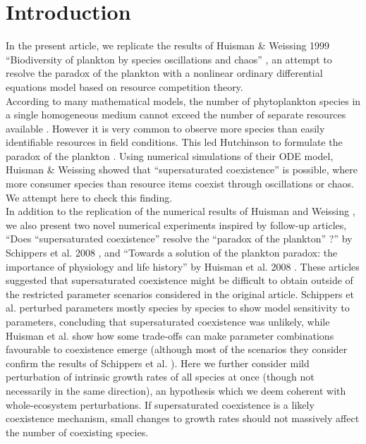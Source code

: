 \section{Introduction}
In the present article, we replicate the results of Huisman \& Weissing 1999 ``Biodiversity of plankton by species oscillations and chaos'' \cite{1999:Huisman}, an attempt to resolve the paradox of 
the plankton \cite{1961:Hutchinson} with a nonlinear ordinary differential equations model based on resource competition theory.\\

According to many mathematical models, the number of phytoplankton species in a single homogeneous medium cannot exceed the number of separate resources available \cite{1960:Hardin,1973:Phillips,1980:Armstrong}. However it is very common to observe more species than easily identifiable resources in field conditions. This led Hutchinson to formulate the paradox of the plankton \cite{1961:Hutchinson}. Using numerical simulations of their ODE model, Huisman \& Weissing \cite{1999:Huisman} showed that ``supersaturated coexistence'' is possible, where more consumer species than resource items coexist through oscillations or chaos. We attempt here to check this finding. \\

In addition to the replication of the numerical results of Huisman and Weissing \cite{1999:Huisman}, we also present two novel numerical experiments inspired by follow-up articles, ``Does ``supersaturated coexistence'' resolve the ``paradox of the plankton'' ?'' by Schippers et al. 2008 \cite{2008:Schippers}, and ``Towards a solution of the plankton paradox: the importance of physiology and life history'' by Huisman et al. 2008 \cite{2008:Huisman}. These articles suggested that supersaturated coexistence might be difficult to obtain outside of the restricted parameter scenarios considered in the original article. Schippers et al. \cite{2008:Schippers} perturbed parameters mostly species by species to show model sensitivity to parameters, concluding that supersaturated coexistence was unlikely, while Huisman et al. \cite{2008:Huisman} show how some trade-offs can make parameter combinations favourable to coexistence emerge (although most of the scenarios they consider confirm the results of Schippers et al. \cite{2008:Schippers}). Here we further consider mild perturbation of intrinsic growth rates of all species at once (though not necessarily in the same direction), an hypothesis which we deem coherent with whole-ecosystem perturbations. If supersaturated coexistence is a likely coexistence mechanism, small changes to growth rates should not massively affect the number of coexisting species. 


